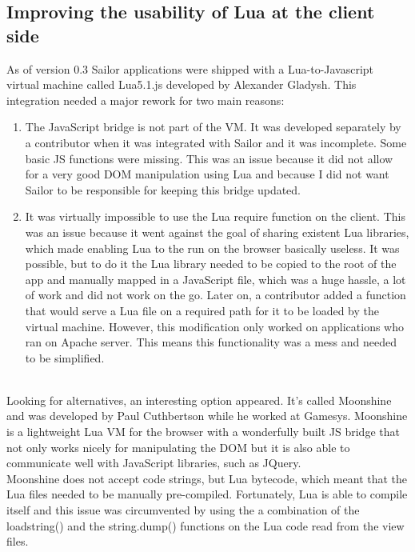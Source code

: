 \documentclass{article}
\begin{document}
\subsection{Improving the usability of Lua at the client side}

As of version 0.3 Sailor applications were shipped with a Lua-to-Javascript virtual machine called Lua5.1.js\autocite{lua51js} developed by Alexander Gladysh. This integration needed a major rework for two main reasons:\\

\begin{enumerate}\item The JavaScript bridge is not part of the VM. It was developed separately by a contributor when it was integrated with Sailor and it was incomplete. Some basic JS functions were missing. This was an issue because it did not allow for a very good DOM manipulation using Lua and because I did not want Sailor to be responsible for keeping this bridge updated. 

\item It was virtually impossible to use the Lua require function on the client. This was an issue because it went against the goal of sharing existent Lua libraries, which made enabling Lua to the run on the browser basically useless. It was possible, but to do it the Lua library needed to be copied to the root of the app and manually mapped in a JavaScript file, which was a huge hassle, a lot of work and did not work on the go. Later on, a contributor added a function that would serve a Lua file on a required path for it to be loaded by the virtual machine. However, this modification only worked on applications who ran on Apache server. This means this functionality was a mess and needed to be simplified. 
\end{enumerate}\\

Looking for alternatives, an interesting option appeared. It's called Moonshine\autocite{moonshine} and was developed by Paul Cuthbertson while he worked at Gamesys. Moonshine is a lightweight Lua VM for the browser with a wonderfully built JS bridge that not only works nicely for manipulating the DOM but it is also able to communicate well with JavaScript libraries, such as JQuery. \\

Moonshine does not accept code strings, but Lua bytecode, which meant that the Lua files needed to be manually pre-compiled. Fortunately, Lua is able to compile itself and this issue was circumvented by using the a combination of the loadstring() and the string.dump() functions on the Lua code read from the view files.\\
\end{document}
